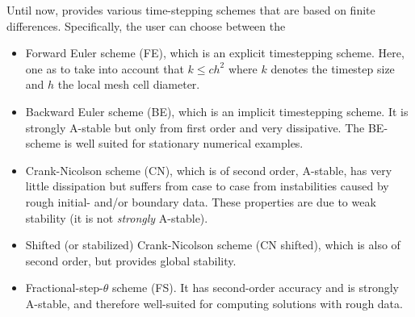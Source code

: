 Until now, \dope{} provides various time-stepping schemes
that are based on finite differences. Specifically, the 
user can choose between the 
\begin{itemize}
\item Forward Euler scheme (FE), which is an explicit timestepping scheme. Here, 
one as to take into account that $k\leq ch^2$ where $k$ denotes the timestep size
and $h$ the local mesh cell diameter.
\item Backward Euler scheme (BE), which is an implicit timestepping scheme.
It is strongly A-stable but only from first order and very dissipative. 
The BE-scheme is well suited for stationary numerical examples.  
\item Crank-Nicolson scheme (CN), which is of second order, 
A-stable, has very little dissipation but suffers from case to case from instabilities caused by rough
initial- and/or boundary data. These properties are due to weak stability (it is not \textit{strongly}
A-stable).
\item Shifted (or stabilized) Crank-Nicolson scheme (CN shifted), which is
  also of second order, but provides global stability.
\item Fractional-step-$\theta$ scheme (FS). 
It has second-order accuracy and is strongly A-stable, and therefore
well-suited for computing solutions with rough data. 
\end{itemize}
